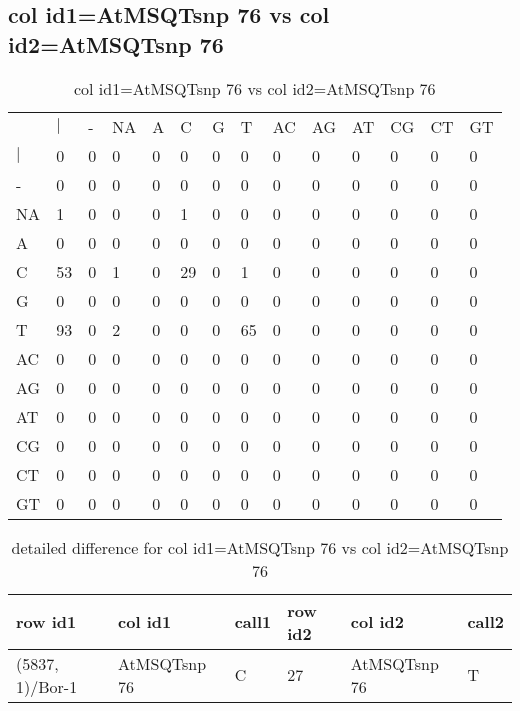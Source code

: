 \subsection{col id1=AtMSQTsnp 76 vs col id2=AtMSQTsnp 76}
\begin{center}
\begin{longtable}{|l|l|l|l|l|l|l|l|l|l|l|l|l|l|}
\caption{col id1=AtMSQTsnp 76 vs col id2=AtMSQTsnp 76} \label{table_dm772}\\
\hline
\\
\hline
&$|$&-&NA&A&C&G&T&AC&AG&AT&CG&CT&GT\\
$|$&0&0&0&0&0&0&0&0&0&0&0&0&0\\
-&0&0&0&0&0&0&0&0&0&0&0&0&0\\
NA&1&0&0&0&1&0&0&0&0&0&0&0&0\\
A&0&0&0&0&0&0&0&0&0&0&0&0&0\\
C&53&0&1&0&29&0&1&0&0&0&0&0&0\\
G&0&0&0&0&0&0&0&0&0&0&0&0&0\\
T&93&0&2&0&0&0&65&0&0&0&0&0&0\\
AC&0&0&0&0&0&0&0&0&0&0&0&0&0\\
AG&0&0&0&0&0&0&0&0&0&0&0&0&0\\
AT&0&0&0&0&0&0&0&0&0&0&0&0&0\\
CG&0&0&0&0&0&0&0&0&0&0&0&0&0\\
CT&0&0&0&0&0&0&0&0&0&0&0&0&0\\
GT&0&0&0&0&0&0&0&0&0&0&0&0&0\\
\hline
\end{longtable}
\end{center}

\begin{center}
\begin{longtable}{|l|l|l|l|l|l|}
\caption{detailed difference for col id1=AtMSQTsnp 76 vs col id2=AtMSQTsnp 76} \label{table_dm773}\\
\hline
row id1&col id1&call1&row id2&col id2&call2\\
\hline
(5837, 1)/Bor-1&AtMSQTsnp 76&C&27&AtMSQTsnp 76&T\\
\hline
\end{longtable}
\end{center}

